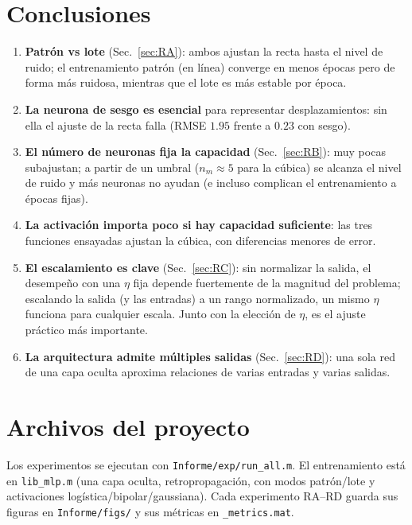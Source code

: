 \documentclass[11pt,a4paper]{article}
\newcommand{\code}[1]{\texttt{\small #1}}
\begin{document}
\section{Conclusiones}
\begin{enumerate}
  \item \textbf{Patrón vs lote} (Sec.~\ref{sec:RA}): ambos ajustan la recta hasta el nivel
  de ruido; el entrenamiento patrón (en línea) converge en menos épocas pero de forma más
  ruidosa, mientras que el lote es más estable por época.

  \item \textbf{La neurona de sesgo es esencial} para representar desplazamientos: sin ella
  el ajuste de la recta falla (RMSE $1.95$ frente a $0.23$ con sesgo).

  \item \textbf{El número de neuronas fija la capacidad} (Sec.~\ref{sec:RB}): muy pocas
  subajustan; a partir de un umbral ($n_m\!\approx\!5$ para la cúbica) se alcanza el nivel
  de ruido y más neuronas no ayudan (e incluso complican el entrenamiento a épocas fijas).

  \item \textbf{La activación importa poco si hay capacidad suficiente}: las tres
  funciones ensayadas ajustan la cúbica, con diferencias menores de error.

  \item \textbf{El escalamiento es clave} (Sec.~\ref{sec:RC}): sin normalizar la salida,
  el desempeño con una $\eta$ fija depende fuertemente de la magnitud del problema;
  escalando la salida (y las entradas) a un rango normalizado, un mismo $\eta$ funciona
  para cualquier escala. Junto con la elección de $\eta$, es el ajuste práctico más
  importante.

  \item \textbf{La arquitectura admite múltiples salidas} (Sec.~\ref{sec:RD}): una sola red
  de una capa oculta aproxima relaciones de varias entradas y varias salidas.
\end{enumerate}

\appendix
\section{Archivos del proyecto}
Los experimentos se ejecutan con \code{Informe/exp/run\_all.m}. El entrenamiento está
en \code{lib\_mlp.m} (una capa oculta, retropropagación, con modos patrón/lote y
activaciones logística/bipolar/gaussiana). Cada experimento RA--RD guarda sus figuras en
\code{Informe/figs/} y sus métricas en \code{*\_metrics.mat}.
\end{document}
